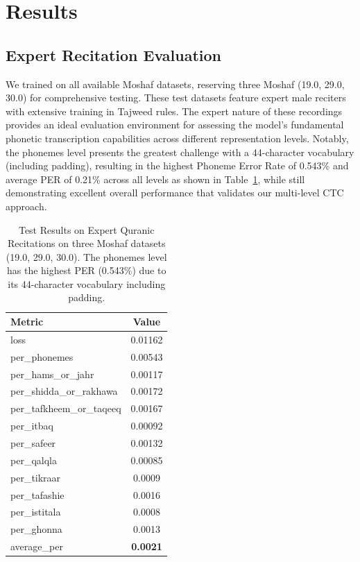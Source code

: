 \section{Results}
\subsection{Expert Recitation Evaluation}
We trained on all available Moshaf datasets, reserving three Moshaf (19.0, 29.0, 30.0) for comprehensive testing. These test datasets feature expert male reciters with extensive training in Tajweed rules. The expert nature of these recordings provides an ideal evaluation environment for assessing the model's fundamental phonetic transcription capabilities across different representation levels. Notably, the phonemes level presents the greatest challenge with a 44-character vocabulary (including padding), resulting in the highest Phoneme Error Rate of 0.543\% and average PER of 0.21\% across all levels as shown in Table~\ref{tab:results}, while still demonstrating excellent overall performance that validates our multi-level CTC approach.

\begin{table}[t]
	\centering
	\begin{tabular}{lc}
		\hline
		\textbf{Metric}           & \textbf{Value}  \\
		\hline
		loss                      & 0.01162         \\
		per\_phonemes             & 0.00543         \\
		per\_hams\_or\_jahr       & 0.00117         \\
		per\_shidda\_or\_rakhawa  & 0.00172         \\
		per\_tafkheem\_or\_taqeeq & 0.00167         \\
		per\_itbaq                & 0.00092         \\
		per\_safeer               & 0.00132         \\
		per\_qalqla               & 0.00085         \\
		per\_tikraar              & 0.0009          \\
		per\_tafashie             & 0.0016          \\
		per\_istitala             & 0.0008          \\
		per\_ghonna               & 0.0013          \\
		average\_per              & \textbf{0.0021} \\
		\hline
	\end{tabular}
	\caption{Test Results on Expert Quranic Recitations on three Moshaf datasets (19.0, 29.0, 30.0). The phonemes level has the highest PER (0.543\%) due to its 44-character vocabulary including padding.}
	\vspace{3pt}
	\label{tab:results}
\end{table}

